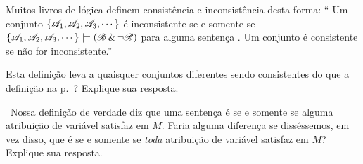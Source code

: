 \problempart
\label{pr.SemanticsEssay}
\begin{earg}
\item Muitos livros de lógica definem consistência e inconsistência desta forma:
`` Um conjunto $\{\mathscr{A}_1,\mathscr{A}_2,\mathscr{A}_3,\cdots\}$ é inconsistente se e somente se $\{\mathscr{A}_1,\mathscr{A}_2,\mathscr{A}_3,\cdots\}\models(\mathscr{B}\,\&\,\neg\mathscr{B})$ para alguma sentença . Um conjunto é consistente se não for inconsistente.''

Esta definição leva a quaisquer conjuntos diferentes sendo consistentes do que a definição na p.~\pageref{def.consistencySL}? Explique sua resposta.

\item\leftsolutions\ Nossa definição de verdade diz que uma sentença  é   se e somente se alguma atribuição de variável satisfaz  em $M$. Faria alguma diferença se disséssemos, em vez disso, que  é   se e somente se \emph{toda} atribuição de variável satisfaz  em $M$? Explique sua resposta.
\end{earg}
